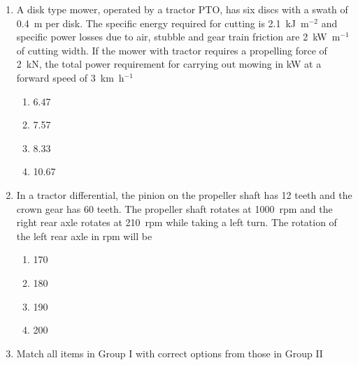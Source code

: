 \documentclass[journal]{IEEEtran}
\numberwithin{equation}{enumi}
\numberwithin{figure}{enumi}
\begin{document}
\begin{enumerate}
    \item A disk type mower, operated by a tractor PTO, has six discs with a swath of 0.4~m per disk. The specific energy required for cutting is 2.1~kJ~m$^{-2}$ and specific power losses due to air, stubble and gear train friction are 2~kW~m$^{-1}$ of cutting width. If the mower with tractor requires a propelling force of 2~kN, the total power requirement for carrying out mowing in kW at a forward speed of 3~km~h$^{-1}$
     \hfill{}
\begin{multicols}{4}
    \begin{enumerate}
    \item  6.47 
    \item 7.57
    \item 8.33
    \item 10.67
    \end{enumerate}
    \end{multicols}  
    


    \item In a tractor differential, the pinion on the propeller shaft has 12 teeth and the crown gear has 60 teeth. The propeller shaft rotates at 1000~rpm and the right rear axle rotates at 210~rpm while taking a left turn. The rotation of the left rear axle in rpm will be
      \hfill{}
\begin{multicols}{4}
    \begin{enumerate}
    \item 170
    \item 180
    \item 190
    \item 200
    \end{enumerate}
    \end{multicols}  
    


    \item Match all items in Group I with correct options from those in Group II


\end{enumerate}
\end{document}
